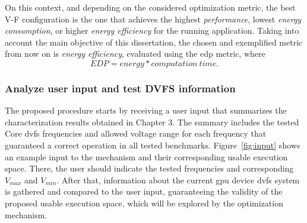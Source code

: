 On this context, and depending on the considered optimization metric, the best V-F configuration is the one that achieves the highest \textit{performance}, lowest \textit{energy consumption}, or higher \textit{energy efficiency} for the running application. Taking into account the main objective of this dissertation, the chosen and exemplified metric from now on is \textit{energy efficiency}, evaluated using the \acrshort{edp} metric, where 
\begin{equation}
	EDP=energy * computation \: time.
	\label{eq:edp}
\end{equation}

\subsubsection{Analyze user input and test DVFS information}

The proposed procedure starts by receiving a user input that summarizes the characterization results obtained in Chapter 3. The summary includes the tested Core \acrshort{dvfs} frequencies and allowed voltage range for each frequency that guaranteed a correct operation in all tested benchmarks. Figure~\ref{fig:input} shows an example input to the mechanism and their corresponding usable execution space. There, the user should indicate the tested frequencies and corresponding $V_{max}$ and $V_{min}$. After that, information about the current \acrshort{gpu} device \acrshort{dvfs} system is gathered and compared to the user input, guaranteeing the validity of the proposed usable execution space, which will be explored by the optimization mechanism.


